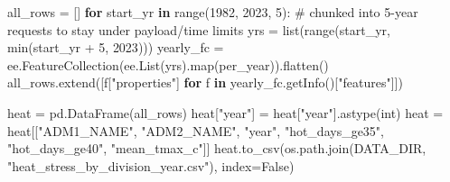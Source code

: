 \documentclass[
  letterpaper,
  DIV=11,
  numbers=noendperiod]{scrartcl}
\newenvironment{Shaded}{\begin{snugshade}}{\end{snugshade}}
\newcommand{\BuiltInTok}[1]{\textcolor[rgb]{0.00,0.23,0.31}{#1}}
\newcommand{\CommentTok}[1]{\textcolor[rgb]{0.37,0.37,0.37}{#1}}
\newcommand{\ControlFlowTok}[1]{\textcolor[rgb]{0.00,0.23,0.31}{\textbf{#1}}}
\newcommand{\DecValTok}[1]{\textcolor[rgb]{0.68,0.00,0.00}{#1}}
\newcommand{\KeywordTok}[1]{\textcolor[rgb]{0.00,0.23,0.31}{\textbf{#1}}}
\newcommand{\NormalTok}[1]{\textcolor[rgb]{0.00,0.23,0.31}{#1}}
\newcommand{\OperatorTok}[1]{\textcolor[rgb]{0.37,0.37,0.37}{#1}}
\newcommand{\StringTok}[1]{\textcolor[rgb]{0.13,0.47,0.30}{#1}}
\newcommand{\VariableTok}[1]{\textcolor[rgb]{0.07,0.07,0.07}{#1}}
\begin{document}
\begin{Shaded}
\begin{Highlighting}[]
\NormalTok{all\_rows }\OperatorTok{=}\NormalTok{ []}
\ControlFlowTok{for}\NormalTok{ start\_yr }\KeywordTok{in} \BuiltInTok{range}\NormalTok{(}\DecValTok{1982}\NormalTok{, }\DecValTok{2023}\NormalTok{, }\DecValTok{5}\NormalTok{):  }\CommentTok{\# chunked into 5{-}year requests to stay under payload/time limits}
\NormalTok{    yrs }\OperatorTok{=} \BuiltInTok{list}\NormalTok{(}\BuiltInTok{range}\NormalTok{(start\_yr, }\BuiltInTok{min}\NormalTok{(start\_yr }\OperatorTok{+} \DecValTok{5}\NormalTok{, }\DecValTok{2023}\NormalTok{)))}
\NormalTok{    yearly\_fc }\OperatorTok{=}\NormalTok{ ee.FeatureCollection(ee.List(yrs).}\BuiltInTok{map}\NormalTok{(per\_year)).flatten()}
\NormalTok{    all\_rows.extend([f[}\StringTok{"properties"}\NormalTok{] }\ControlFlowTok{for}\NormalTok{ f }\KeywordTok{in}\NormalTok{ yearly\_fc.getInfo()[}\StringTok{"features"}\NormalTok{]])}

\NormalTok{heat }\OperatorTok{=}\NormalTok{ pd.DataFrame(all\_rows)}
\NormalTok{heat[}\StringTok{"year"}\NormalTok{] }\OperatorTok{=}\NormalTok{ heat[}\StringTok{"year"}\NormalTok{].astype(}\BuiltInTok{int}\NormalTok{)}
\NormalTok{heat }\OperatorTok{=}\NormalTok{ heat[[}\StringTok{"ADM1\_NAME"}\NormalTok{, }\StringTok{"ADM2\_NAME"}\NormalTok{, }\StringTok{"year"}\NormalTok{, }\StringTok{"hot\_days\_ge35"}\NormalTok{, }\StringTok{"hot\_days\_ge40"}\NormalTok{, }\StringTok{"mean\_tmax\_c"}\NormalTok{]]}
\NormalTok{heat.to\_csv(os.path.join(DATA\_DIR, }\StringTok{"heat\_stress\_by\_division\_year.csv"}\NormalTok{), index}\OperatorTok{=}\VariableTok{False}\NormalTok{)}
\end{Highlighting}
\end{Shaded}
\end{document}
